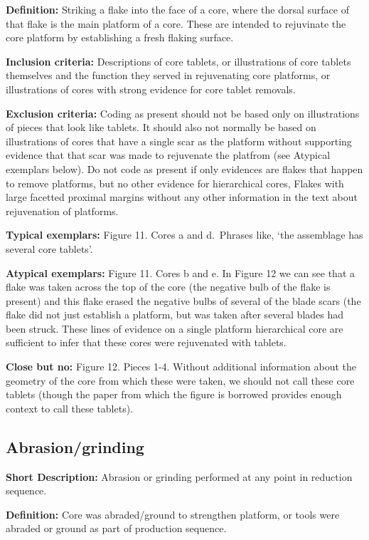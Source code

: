 \documentclass[
]{article}
\begin{document}
\textbf{Definition:} Striking a flake into the face of a core, where the
dorsal surface of that flake is the main platform of a core. These are
intended to rejuvinate the core platform by establishing a fresh flaking
surface.

\textbf{Inclusion criteria:} Descriptions of core tablets, or
illustrations of core tablets themselves and the function they served in
rejuvenating core platforms, or illustrations of cores with strong
evidence for core tablet removals.

\textbf{Exclusion criteria:} Coding as present should not be based only
on illustrations of pieces that look like tablets. It should also not
normally be based on illustrations of cores that have a single scar as
the platform without supporting evidence that that scar was made to
rejuvenate the platfrom (see Atypical exemplars below). Do not code as
present if only evidences are flakes that happen to remove platforms,
but no other evidence for hierarchical cores, Flakes with large facetted
proximal margins without any other information in the text about
rejuvenation of platforms.

\textbf{Typical exemplars:} Figure 11. Cores a and d.~Phrases like, `the
assemblage has several core tablets'.

\textbf{Atypical exemplars:} Figure 11. Cores b and e. In Figure 12 we
can see that a flake was taken across the top of the core (the negative
bulb of the flake is present) and this flake erased the negative bulbs
of several of the blade scars (the flake did not just establish a
platform, but was taken after several blades had been struck. These
lines of evidence on a single platform hierarchical core are sufficient
to infer that these cores were rejuvenated with tablets.

\textbf{Close but no:} Figure 12. Pieces 1-4. Without additional
information about the geometry of the core from which these were taken,
we should not call these core tablets (though the paper from which the
figure is borrowed provides enough context to call these tablets).

\hypertarget{abrasiongrinding}{%
\subsection{Abrasion/grinding}\label{abrasiongrinding}}

\textbf{Short Description:} Abrasion or grinding performed at any point
in reduction sequence.

\textbf{Definition:} Core was abraded/ground to strengthen platform, or
tools were abraded or ground as part of production sequence.
\end{document}
